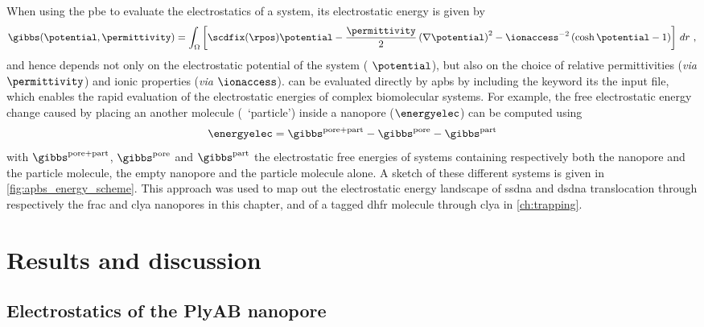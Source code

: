 When using the \gls{pbe} to evaluate the electrostatics of a system, its electrostatic energy is given
by~\cite{Baker-2005}
%
\begin{equation}\label{eq:pbe_energy}
  \gibbs (\potential, \permittivity) = \int_\Omega \left[
    \scdfix(\rpos) \potential
    - \dfrac{\permittivity}{2}\left( \nabla \potential \right)^2
    - \ionaccess^{-2} \left( \cosh \potential - 1 \right)
  \right] \,dr
  \text{ ,}
\end{equation}
%
and hence depends not only on the electrostatic potential of the system ( $\potential$), but also on
the choice of relative permittivities (\textit{via} $\permittivity$) and ionic properties (\textit{via}
$\ionaccess$).  can be evaluated directly by \gls{apbs} by including the 
keyword its the input file, which enables the rapid evaluation of the electrostatic energies of complex
biomolecular systems. For example, the free electrostatic energy change caused by placing an another molecule
(\ie~`particle') inside a nanopore ($\energyelec$) can be computed using~\cite{Homeyer-2015}
%
\begin{equation}\label{eq:electrostatic_energy}
  \energyelec = \gibbs^{\rm{pore+part}} - \gibbs^{\rm{pore}} - \gibbs^{\rm{part}}
\end{equation}
%
with $\gibbs^{\rm{pore+part}}$, $\gibbs^{\rm{pore}}$ and $\gibbs^{\rm{part}}$ the electrostatic free energies
of systems containing respectively both the nanopore and the particle molecule, the empty nanopore and the
particle molecule alone. A sketch of these different systems is given in \cref{fig:apbs_energy_scheme}. This
approach was used to map out the electrostatic energy landscape of \gls{ssdna} and \gls{dsdna} translocation
through respectively the \gls{frac} and \gls{clya} nanopores in this chapter, and of a tagged \gls{dhfr}
molecule through \gls{clya} in \cref{ch:trapping}.



%
\clearpage
%


\section{Results and discussion}
%
\label{sec:elec:results}
%


\subsection{Electrostatics of the PlyAB nanopore}
%
\label{sec:elec:plyab}
%

